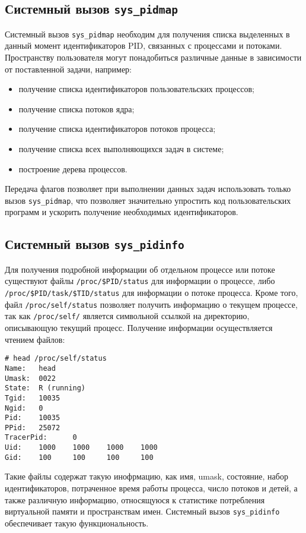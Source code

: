 \subsection{Системный вызов \texttt{sys\_pidmap}}
\label{sub:sys:sys_pidmap}

Системный вызов \texttt{sys\_pidmap} необходим для получения списка выделенных в
данный момент идентификаторов PID, связанных с процессами и потоками.
Пространству пользователя могут понадобиться различные данные в зависимости от
поставленной задачи, например:
\begin{itemize}
\item получение списка идентификаторов пользовательских процессов;
\item получение списка потоков ядра;
\item получение списка идентификаторов потоков процесса;
\item получение списка всех выполняющихся задач в системе;
\item построение дерева процессов.
\end{itemize}

Передача флагов позволяет при выполнении данных задач использовать только вызов
\texttt{sys\_pidmap}, что позволяет значительно упростить код пользовательских
программ и ускорить получение необходимых идентификаторов.

\subsection{Системный вызов \texttt{sys\_pidinfo}}
\label{sub:sys:sys_pidinfo}

Для получения подробной информации об отдельном процессе или потоке существуют
файлы \texttt{/proc/\$PID/status} для информации о процессе, либо
\texttt{/proc/\$PID/task/\$TID/status} для информации о потоке процесса. Кроме
того, файл \texttt{/proc/self/status} позволяет получить информацию о текущем
процессе, так как \texttt{/proc/self/} является символьной ссылкой на
директорию, описывающую текущий процесс. Получение информации осуществляется
чтением файлов:

\medskip
\begin{lstlisting}[style=cstyle]
# head /proc/self/status
Name:   head
Umask:  0022
State:  R (running)
Tgid:   10035
Ngid:   0
Pid:    10035
PPid:   25072
TracerPid:      0
Uid:    1000    1000    1000    1000
Gid:    100     100     100     100
\end{lstlisting}
\medskip

Такие файлы содержат такую инофрмацию, как имя, umask, состояние, набор
идентификаторов, потраченное время работы процесса, число потоков и детей, а
также различную информацию, относящуюся к статистике потребления виртуальной
памяти и пространствам имен. Системный вызов \texttt{sys\_pidinfo} обеспечивает
такую функциональность.

